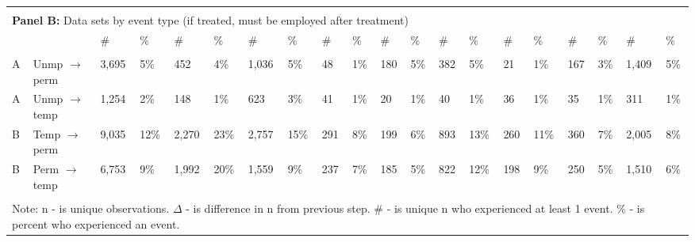 \begin{tabular}{l>{\raggedright\arraybackslash}p{2.5in}llllllllllllllllll}
\hline \\[-1.8ex]  
 
\multicolumn{14}{l}{{\bf Panel B:} Data sets by event type (if treated, must be employed after treatment)} \\ 

& 
& \# & \%
& \# & \%
& \# & \%
& \# & \%
& \# & \%
& \# & \%
& \# & \%
& \# & \%
& \# & \%
\\ 
\cmidrule(lr){1-2}
\cmidrule(lr){3-4}
\cmidrule(lr){5-6}
\cmidrule(lr){7-8}
\cmidrule(lr){9-10}
\cmidrule(lr){11-12}
\cmidrule(lr){13-14}
\cmidrule(lr){15-16}
\cmidrule(lr){17-18}
\cmidrule(lr){19-20}
\\[-1.8ex]  
 
A & Unmp $\rightarrow$ perm & 3,695 & 5\% & 452 & 4\% & 1,036 & 5\% & 48 & 1\% & 180 & 5\% & 382 & 5\% & 21 & 1\% & 167 & 3\% & 1,409 & 5\% \\ 
  A & Unmp $\rightarrow$ temp & 1,254 & 2\% & 148 & 1\% & 623 & 3\% & 41 & 1\% & 20 & 1\% & 40 & 1\% & 36 & 1\% & 35 & 1\% & 311 & 1\% \\ 
  B & Temp $\rightarrow$ perm & 9,035 & 12\% & 2,270 & 23\% & 2,757 & 15\% & 291 & 8\% & 199 & 6\% & 893 & 13\% & 260 & 11\% & 360 & 7\% & 2,005 & 8\% \\ 
  B & Perm $\rightarrow$ temp & 6,753 & 9\% & 1,992 & 20\% & 1,559 & 9\% & 237 & 7\% & 185 & 5\% & 822 & 12\% & 198 & 9\% & 250 & 5\% & 1,510 & 6\% \\ 
   \bottomrule \\[-1.8ex] \multicolumn{20}{p{12in}}{Note: n - is unique observations.  $\Delta$ - is difference in n from previous step.  \# - is unique n who experienced at least 1 event.  \% - is percent who experienced an event.} 
\end{tabular}
